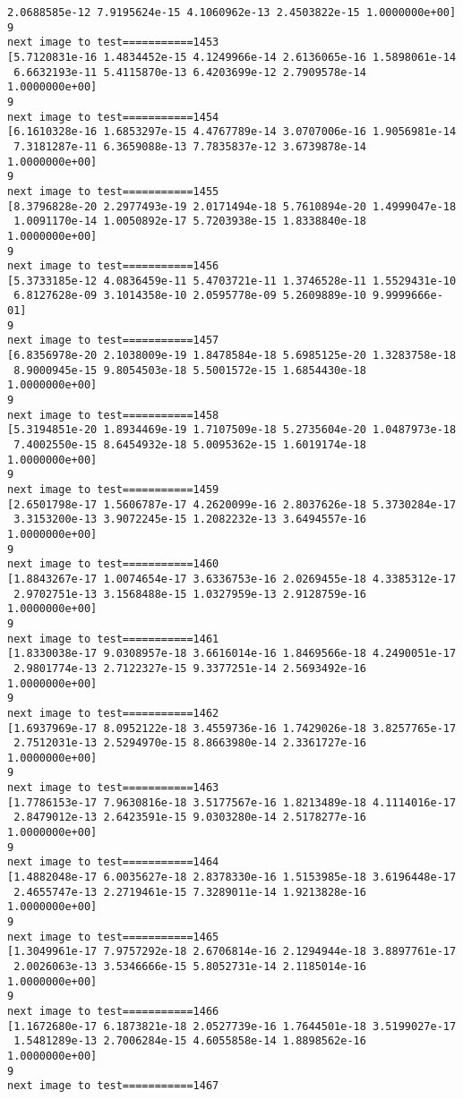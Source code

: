 \documentclass[11pt]{article}
\begin{document}
\begin{Verbatim}[commandchars=\\\{\}]
 2.0688585e-12 7.9195624e-15 4.1060962e-13 2.4503822e-15 1.0000000e+00]
9
next image to test===========1453
[5.7120831e-16 1.4834452e-15 4.1249966e-14 2.6136065e-16 1.5898061e-14
 6.6632193e-11 5.4115870e-13 6.4203699e-12 2.7909578e-14 1.0000000e+00]
9
next image to test===========1454
[6.1610328e-16 1.6853297e-15 4.4767789e-14 3.0707006e-16 1.9056981e-14
 7.3181287e-11 6.3659088e-13 7.7835837e-12 3.6739878e-14 1.0000000e+00]
9
next image to test===========1455
[8.3796828e-20 2.2977493e-19 2.0171494e-18 5.7610894e-20 1.4999047e-18
 1.0091170e-14 1.0050892e-17 5.7203938e-15 1.8338840e-18 1.0000000e+00]
9
next image to test===========1456
[5.3733185e-12 4.0836459e-11 5.4703721e-11 1.3746528e-11 1.5529431e-10
 6.8127628e-09 3.1014358e-10 2.0595778e-09 5.2609889e-10 9.9999666e-01]
9
next image to test===========1457
[6.8356978e-20 2.1038009e-19 1.8478584e-18 5.6985125e-20 1.3283758e-18
 8.9000945e-15 9.8054503e-18 5.5001572e-15 1.6854430e-18 1.0000000e+00]
9
next image to test===========1458
[5.3194851e-20 1.8934469e-19 1.7107509e-18 5.2735604e-20 1.0487973e-18
 7.4002550e-15 8.6454932e-18 5.0095362e-15 1.6019174e-18 1.0000000e+00]
9
next image to test===========1459
[2.6501798e-17 1.5606787e-17 4.2620099e-16 2.8037626e-18 5.3730284e-17
 3.3153200e-13 3.9072245e-15 1.2082232e-13 3.6494557e-16 1.0000000e+00]
9
next image to test===========1460
[1.8843267e-17 1.0074654e-17 3.6336753e-16 2.0269455e-18 4.3385312e-17
 2.9702751e-13 3.1568488e-15 1.0327959e-13 2.9128759e-16 1.0000000e+00]
9
next image to test===========1461
[1.8330038e-17 9.0308957e-18 3.6616014e-16 1.8469566e-18 4.2490051e-17
 2.9801774e-13 2.7122327e-15 9.3377251e-14 2.5693492e-16 1.0000000e+00]
9
next image to test===========1462
[1.6937969e-17 8.0952122e-18 3.4559736e-16 1.7429026e-18 3.8257765e-17
 2.7512031e-13 2.5294970e-15 8.8663980e-14 2.3361727e-16 1.0000000e+00]
9
next image to test===========1463
[1.7786153e-17 7.9630816e-18 3.5177567e-16 1.8213489e-18 4.1114016e-17
 2.8479012e-13 2.6423591e-15 9.0303280e-14 2.5178277e-16 1.0000000e+00]
9
next image to test===========1464
[1.4882048e-17 6.0035627e-18 2.8378330e-16 1.5153985e-18 3.6196448e-17
 2.4655747e-13 2.2719461e-15 7.3289011e-14 1.9213828e-16 1.0000000e+00]
9
next image to test===========1465
[1.3049961e-17 7.9757292e-18 2.6706814e-16 2.1294944e-18 3.8897761e-17
 2.0026063e-13 3.5346666e-15 5.8052731e-14 2.1185014e-16 1.0000000e+00]
9
next image to test===========1466
[1.1672680e-17 6.1873821e-18 2.0527739e-16 1.7644501e-18 3.5199027e-17
 1.5481289e-13 2.7006284e-15 4.6055858e-14 1.8898562e-16 1.0000000e+00]
9
next image to test===========1467

\end{Verbatim}
\end{document}
